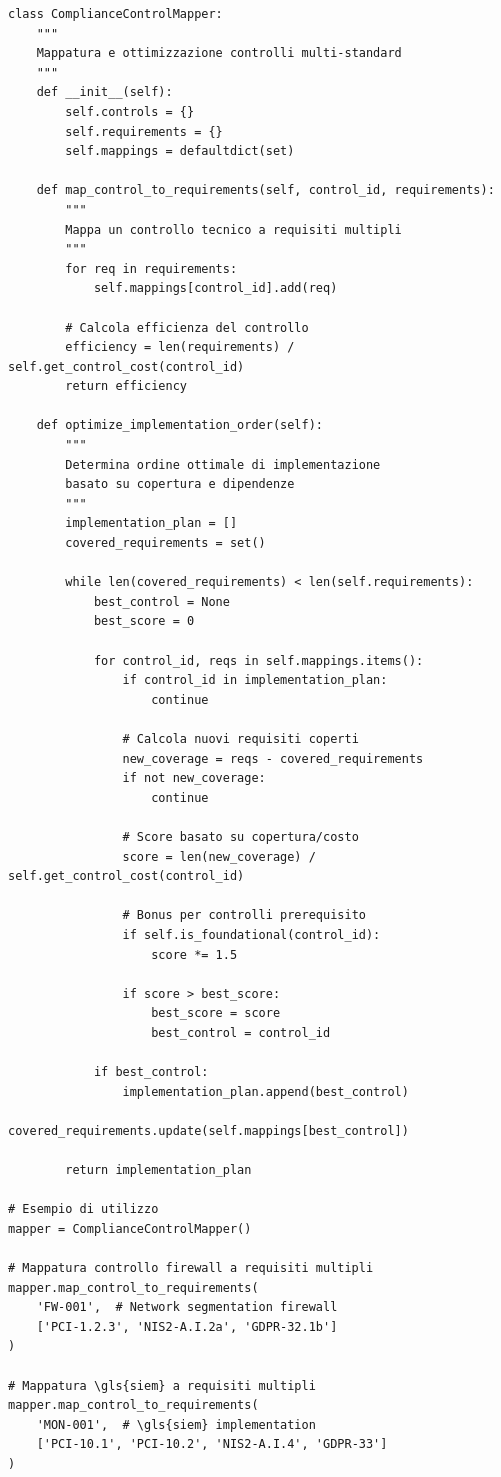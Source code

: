 \begin{lstlisting}[caption={Framework Python per Mappatura Controlli},label={lst:control_mapping}]
class ComplianceControlMapper:
    """
    Mappatura e ottimizzazione controlli multi-standard
    """
    def __init__(self):
        self.controls = {}
        self.requirements = {}
        self.mappings = defaultdict(set)
    
    def map_control_to_requirements(self, control_id, requirements):
        """
        Mappa un controllo tecnico a requisiti multipli
        """
        for req in requirements:
            self.mappings[control_id].add(req)
            
        # Calcola efficienza del controllo
        efficiency = len(requirements) / self.get_control_cost(control_id)
        return efficiency
    
    def optimize_implementation_order(self):
        """
        Determina ordine ottimale di implementazione
        basato su copertura e dipendenze
        """
        implementation_plan = []
        covered_requirements = set()
        
        while len(covered_requirements) < len(self.requirements):
            best_control = None
            best_score = 0
            
            for control_id, reqs in self.mappings.items():
                if control_id in implementation_plan:
                    continue
                    
                # Calcola nuovi requisiti coperti
                new_coverage = reqs - covered_requirements
                if not new_coverage:
                    continue
                
                # Score basato su copertura/costo
                score = len(new_coverage) / self.get_control_cost(control_id)
                
                # Bonus per controlli prerequisito
                if self.is_foundational(control_id):
                    score *= 1.5
                    
                if score > best_score:
                    best_score = score
                    best_control = control_id
            
            if best_control:
                implementation_plan.append(best_control)
                covered_requirements.update(self.mappings[best_control])
        
        return implementation_plan

# Esempio di utilizzo
mapper = ComplianceControlMapper()

# Mappatura controllo firewall a requisiti multipli
mapper.map_control_to_requirements(
    'FW-001',  # Network segmentation firewall
    ['PCI-1.2.3', 'NIS2-A.I.2a', 'GDPR-32.1b']
)

# Mappatura \gls{siem} a requisiti multipli  
mapper.map_control_to_requirements(
    'MON-001',  # \gls{siem} implementation
    ['PCI-10.1', 'PCI-10.2', 'NIS2-A.I.4', 'GDPR-33']
)
\end{lstlisting}

